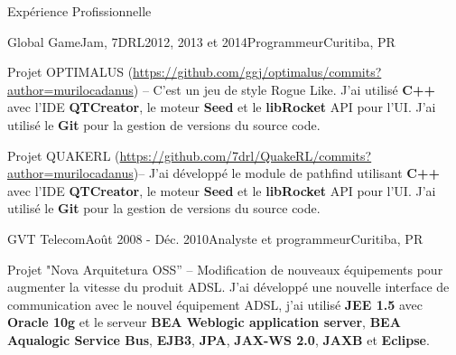 \documentclass{resume}
\begin{document}
\begin{rSection}{Expérience Profissionnelle}
\begin{rSubsection}{Global GameJam, 7DRL}{2012, 2013 et 2014}{Programmeur}{Curitiba, PR}
    \item Projet OPTIMALUS (\url{https://github.com/ggj/optimalus/commits?author=murilocadanus}) – C'est un jeu de style Rogue Like. J'ai utilisé \textbf{C++} avec l'IDE \textbf{QTCreator}, le moteur \textbf{Seed} et le \textbf{libRocket} API pour l'UI.  J'ai utilisé le \textbf{Git} pour la gestion de versions du source code. \\
    \item Projet QUAKERL (\url{https://github.com/7drl/QuakeRL/commits?author=murilocadanus})– J'ai développé le module de pathfind utilisant \textbf{C++} avec l'IDE \textbf{QTCreator}, le moteur \textbf{Seed} et le \textbf{libRocket} API pour l'UI.  J'ai utilisé le \textbf{Git} pour la gestion de versions du source code. \\
    \end{rSubsection}
    \begin{rSubsection}{GVT Telecom}{Août 2008 - Déc. 2010}{Analyste et programmeur}{Curitiba, PR}
    \item Projet "Nova Arquitetura OSS” – Modification de nouveaux équipements pour augmenter la vitesse du produit ADSL. J'ai développé une nouvelle interface de communication avec le nouvel équipement ADSL, j'ai utilisé \textbf{JEE 1.5} avec \textbf{Oracle 10g} et le serveur \textbf{BEA Weblogic application server}, \textbf{BEA Aqualogic Service Bus}, \textbf{EJB3}, \textbf{JPA}, \textbf{JAX-WS 2.0}, \textbf{JAXB} et \textbf{Eclipse}.\\

\end{rSubsection}
\end{rSection}
\end{document}
